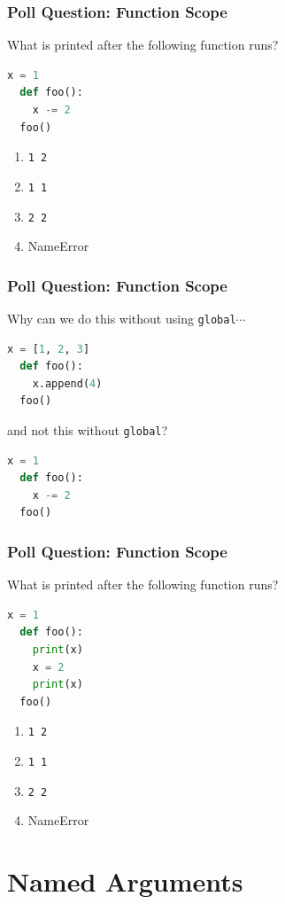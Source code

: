 \documentclass{beamer}
\begin{document}
%
%
\begin{frame}[fragile]
  \frametitle{Poll Question: Function Scope}
  What is printed after the following function runs?
  \begin{lstlisting}[language=Python, autogobble]
  x = 1
  def foo():
    x -= 2
  foo()
  \end{lstlisting}
  \vfill
  \begin{enumerate}[A]
    \item \lstinline|1 2|
    \item \lstinline|1 1|
    \item \lstinline|2 2|
    \item NameError
  \end{enumerate}
\end{frame}

%
%
\begin{frame}[fragile]
  \frametitle{Poll Question: Function Scope}
  Why can we do this without using \lstinline|global|$\cdots$
  \vfill
  \begin{lstlisting}[language=Python, autogobble]
  x = [1, 2, 3]
  def foo():
    x.append(4)
  foo()
  \end{lstlisting}
  \vfill
  and not this without \lstinline|global|?
  \vfill
  \begin{lstlisting}[language=Python, autogobble]
  x = 1
  def foo():
    x -= 2
  foo()
  \end{lstlisting}
\end{frame}


%
%
\begin{frame}[fragile]
  \frametitle{Poll Question: Function Scope}
  What is printed after the following function runs?
  \begin{lstlisting}[language=Python, autogobble]
  x = 1
  def foo():
    print(x)
    x = 2
    print(x)
  foo()
  \end{lstlisting}
  \vfill
  \begin{enumerate}[A]
    \item \lstinline|1 2|
    \item \lstinline|1 1|
    \item \lstinline|2 2|
    \item NameError
  \end{enumerate}
\end{frame}


\section{Named Arguments}
\end{document}
